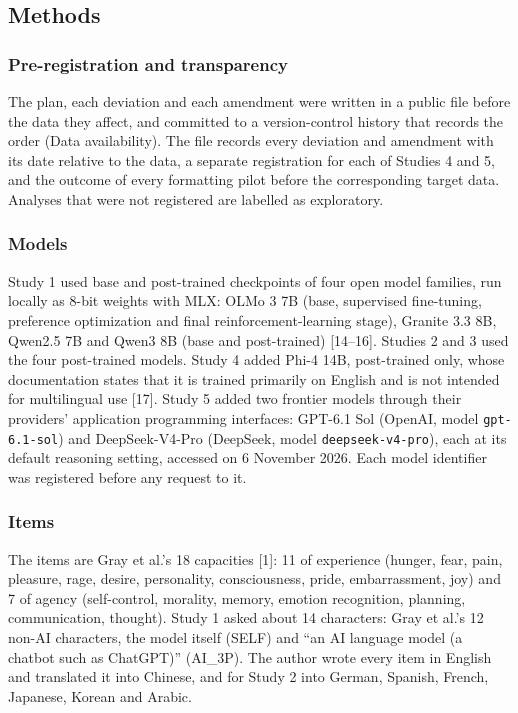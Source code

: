 \documentclass[
  11pt,
]{article}
\begin{document}
\hypertarget{methods}{%
\subsection{Methods}\label{methods}}

\hypertarget{pre-registration-and-transparency}{%
\subsubsection{Pre-registration and
transparency}\label{pre-registration-and-transparency}}

The plan, each deviation and each amendment were written in a public
file before the data they affect, and committed to a version-control
history that records the order (Data availability). The file records
every deviation and amendment with its date relative to the data, a
separate registration for each of Studies 4 and 5, and the outcome of
every formatting pilot before the corresponding target data. Analyses
that were not registered are labelled as exploratory.

\hypertarget{models}{%
\subsubsection{Models}\label{models}}

Study 1 used base and post-trained checkpoints of four open model
families, run locally as 8-bit weights with MLX: OLMo 3 7B (base,
supervised fine-tuning, preference optimization and final
reinforcement-learning stage), Granite 3.3 8B, Qwen2.5 7B and Qwen3 8B
(base and post-trained) {[}14--16{]}. Studies 2 and 3 used the four
post-trained models. Study 4 added Phi-4 14B, post-trained only, whose
documentation states that it is trained primarily on English and is not
intended for multilingual use {[}17{]}. Study 5 added two frontier
models through their providers' application programming interfaces:
GPT-6.1 Sol (OpenAI, model \texttt{gpt-6.1-sol}) and DeepSeek-V4-Pro
(DeepSeek, model \texttt{deepseek-v4-pro}), each at its default
reasoning setting, accessed on 6 November 2026. Each model identifier
was registered before any request to it.

\hypertarget{items}{%
\subsubsection{Items}\label{items}}

The items are Gray et al.'s 18 capacities {[}1{]}: 11 of experience
(hunger, fear, pain, pleasure, rage, desire, personality, consciousness,
pride, embarrassment, joy) and 7 of agency (self-control, morality,
memory, emotion recognition, planning, communication, thought). Study 1
asked about 14 characters: Gray et al.'s 12 non-AI characters, the model
itself (SELF) and ``an AI language model (a chatbot such as ChatGPT)''
(AI\_3P). The author wrote every item in English and translated it into
Chinese, and for Study 2 into German, Spanish, French, Japanese, Korean
and Arabic.
\end{document}
